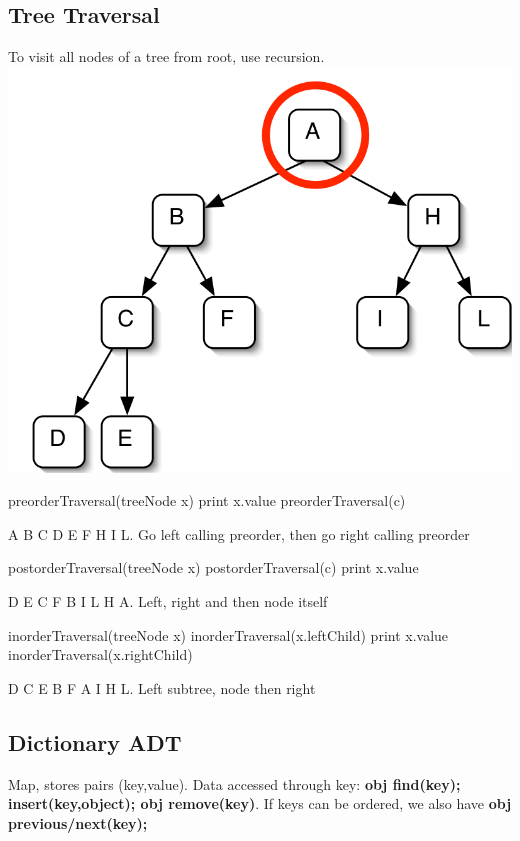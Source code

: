 \subsection{Tree Traversal} To visit all nodes of a tree from root, use recursion.
\\ \includegraphics[scale=0.1]{trav}
\begin{algorithmic}
  \State preorderTraversal(treeNode x)
  \State print x.value
  \State preorderTraversal(c)
  \EndFor
\end{algorithmic}
A B C D E F H I L. Go left calling preorder, then go right calling preorder
\begin{algorithmic}
  \State postorderTraversal(treeNode x)
  \State postorderTraversal(c)
  \EndFor
  \State print x.value
\end{algorithmic}
D E C F B I L H A. Left, right and then node itself
\begin{algorithmic}
  \State inorderTraversal(treeNode x)
  \State inorderTraversal(x.leftChild)
  \State print x.value
  \State inorderTraversal(x.rightChild)
\end{algorithmic}
D C E B F A I H L. Left subtree, node then right
\subsection{Dictionary ADT}
Map, stores pairs (key,value). Data accessed through key: \textbf{obj find(key); insert(key,object);  obj remove(key)}. If keys can be ordered, we also have \textbf{obj previous/next(key);}
\vspace{-7 pt}
